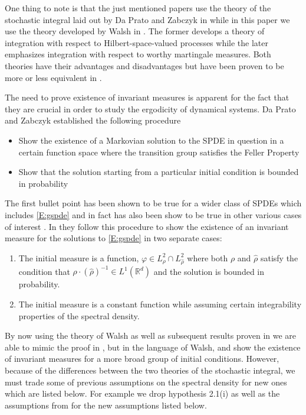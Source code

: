 \documentclass[a4paper,11pt]{article}%
\numberwithin{equation}{section}
\theoremstyle{plain}
\theoremstyle{definition}
\newcommand{\R}{\mathbb{R}}
\begin{document}
One thing to
note is that the just mentioned papers use the theory of the stochastic integral laid out by Da
Prato and Zabczyk in \cite{DZ92} while in this paper we use the theory developed by Walsh in
\cite{Walsh}. The former develops a theory of integration with respect to
Hilbert-space-valued processes while the later emphasizes integration with respect to worthy martingale measures. Both
theories have their advantages and disadvantages but have been proven to be more or less equivalent in \cite{DalQuer}.

The need to prove existence of invariant measures is apparent for the fact that they are crucial in order to study the
ergodicity of dynamical systems. Da Prato and Zabczyk \cite{DZp92} established the following procedure
\begin{itemize}
	\item Show the existence of a Markovian solution to the SPDE in question in a certain function space where the
	transition group satisfies the Feller Property
	\item Show that the solution starting from a particular initial condition is bounded in probability
\end{itemize}
The first bullet point has been shown to be true \cite{DZ96} for a wider class of SPDEs which includes \eqref{E:gspde}
and in fact has also been show to be true in other various cases of interest \cite{Cer01, MS99}.
In \cite{TZ98} they follow this procedure to show the existence of an invariant measure for the solutions to
\eqref{E:gspde} in two separate cases:
\begin{enumerate}
	\item The initial measure is a function, $\varphi \in L^2_\rho \cap L^2_{\widehat{\rho}}$ where both $\rho$ and
	$\widehat{\rho}$ satisfy the condition that $\rho \cdot (\widehat{\rho})^{-1} \in L^1(\R^d)$ and the solution is
	bounded in probability.
	\item The initial measure is a constant function while assuming certain integrability properties of the spectral
	density.
\end{enumerate}
By now using the theory of Walsh as well as subsequent results proven in \cite{CH19} we are able to mimic the
proof in \cite{TZ98}, but in the language of Walsh, and show the existence of invariant measures for a
more broad group of initial conditions. However, because of the differences between the two theories of the stochastic
integral, we must trade some of previous assumptions on the spectral density for new ones which are listed below. For
example we drop hypothesis 2.1(i) as well as the assumptions from \cite[Theorem 3.3]{TZ98} for the new
assumptions listed below.
\end{document}
